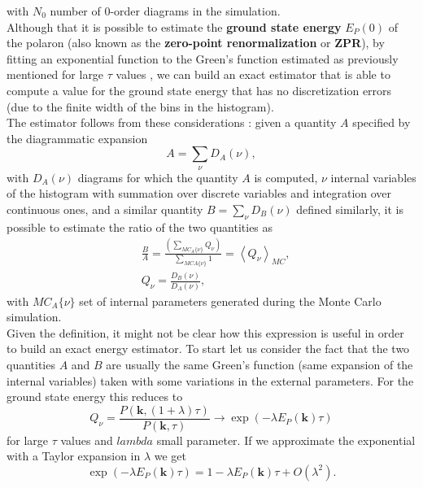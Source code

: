 with $N_0$ number of 0-order diagrams in the simulation.\\
Although that it is possible to estimate the \textbf{ground state energy} $E_P(0)$ of the polaron (also known as the \textbf{zero-point renormalization} or \textbf{ZPR}), by 
fitting an exponential function to the Green's function estimated as previously mentioned for large $\tau$ values \cite{fehske2007computational}, we can build an exact estimator 
that is able to compute a value for the ground state energy that has no discretization errors (due to the finite width of the bins in the histogram).\\
The estimator follows from these considerations \cite{mishchenko2000diagrammatic}: given a quantity $A$ specified by the diagrammatic expansion 
\begin{equation}
    A=\sum_{\nu}D_A(\nu),
\end{equation}
with $D_A(\nu)$ diagrams for which the quantity $A$ is computed, $\nu$ internal variables of the histogram with summation over discrete variables and 
integration over continuous ones, and a similar quantity $B=\sum_{\nu}D_B(\nu)$ defined similarly, it is possible to estimate the ratio of the 
two quantities as 
\begin{equation}
\begin{split}
    &\frac{B}{A}=\frac{\left(\sum_{MC_{A}\{\nu\}}Q_\nu\right)}{\sum_{MC{A}\{\nu\}}1}=\left\langle Q_\nu \right\rangle_{MC},\\
    &Q_\nu=\frac{D_B(\nu)}{D_A(\nu)},
\end{split}
\end{equation}
with $MC_{A}\{\nu\}$ set of internal parameters generated during the Monte Carlo simulation.\\
Given the definition, it might not be clear how this expression is useful in order to build an exact energy estimator. To start let us 
consider the fact that the two quantities $A$ and $B$ are usually the same Green's function (same expansion of the internal variables) taken with some variations 
in the external parameters. For the ground state energy this reduces to
\begin{equation}
    Q_\nu=\frac{P(\mathbf{k},(1+\lambda)\tau)}{P(\mathbf{k},\tau)}\to \exp{\left(-\lambda E_P(\mathbf{k})\tau\right)}
\end{equation}
for large $\tau$ values and $lambda$ small parameter. If we approximate the exponential with a Taylor expansion in $\lambda$ we get
\begin{equation}
    \exp{\left(-\lambda E_P(\mathbf{k})\tau\right)}=1-\lambda E_P(\mathbf{k})\tau+O(\lambda^2).
    \label{lambda_energy_estimator}
\end{equation}
